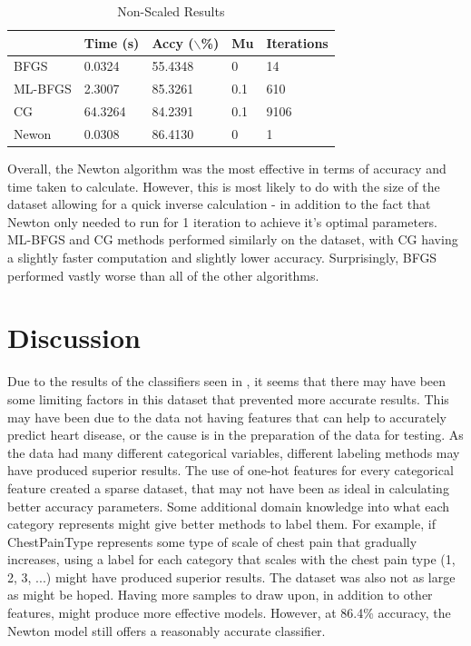 \documentclass[12pt,conference]{IEEEtran}
\begin{document}
\begin{table}[!ht]
\caption{\label{tab:bad-results}Non-Scaled Results }
    \centering
    \begin{tabular}{|l|l|l|l|l|}
    \hline
        ~ & Time (s) & Accy ($\backslash$\%) & Mu & Iterations \\ \hline
        BFGS & 0.0324 & 55.4348 & 0 & 14 \\ \hline
        ML-BFGS & 2.3007 & 85.3261 & 0.1 & 610 \\ \hline
        CG & 64.3264 & 84.2391 & 0.1 & 9106 \\ \hline
        Newon & 0.0308 & 86.4130 & 0 & 1 \\ \hline
    \end{tabular}
\end{table}

Overall, the Newton algorithm was the most effective in terms of accuracy and time taken to calculate. However, this is most likely to do with the size of the dataset allowing for a quick inverse calculation - in addition to the fact that Newton only needed to run for 1 iteration to achieve it's optimal parameters. ML-BFGS and CG methods performed similarly on the dataset, with CG having a slightly faster computation and slightly lower accuracy. Surprisingly, BFGS performed vastly worse than all of the other algorithms.

\section{Discussion}
Due to the results of the classifiers seen in , it seems that there may have been some limiting factors in this dataset that prevented more accurate results. This may have been due to the data not having features that can help to accurately predict heart disease, or the cause is in the preparation of the data for testing. As the data had many different categorical variables, different labeling methods may have produced superior results. The use of one-hot features for every categorical feature created a sparse dataset, that may not have been as ideal in calculating better accuracy parameters. Some additional domain knowledge into what each category represents might give better methods to label them. For example, if ChestPainType represents some type of scale of chest pain that gradually increases, using a label for each category that scales with the chest pain type (1, 2, 3, ...) might have produced superior results. The dataset was also not as large as might be hoped. Having more samples to draw upon, in addition to other features, might produce more effective models. However, at 86.4\% accuracy, the Newton model still offers a reasonably accurate classifier.
\end{document}
